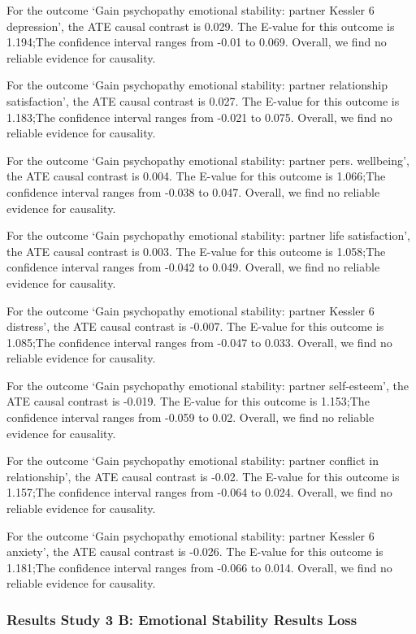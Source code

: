 \documentclass[
  singlecolumn]{article}
\begin{document}
For the outcome `Gain psychopathy emotional stability: partner Kessler 6
depression', the ATE causal contrast is 0.029. The E-value for this
outcome is 1.194;The confidence interval ranges from -0.01 to 0.069.
Overall, we find no reliable evidence for causality.

For the outcome `Gain psychopathy emotional stability: partner
relationship satisfaction', the ATE causal contrast is 0.027. The
E-value for this outcome is 1.183;The confidence interval ranges from
-0.021 to 0.075. Overall, we find no reliable evidence for causality.

For the outcome `Gain psychopathy emotional stability: partner pers.
wellbeing', the ATE causal contrast is 0.004. The E-value for this
outcome is 1.066;The confidence interval ranges from -0.038 to 0.047.
Overall, we find no reliable evidence for causality.

For the outcome `Gain psychopathy emotional stability: partner life
satisfaction', the ATE causal contrast is 0.003. The E-value for this
outcome is 1.058;The confidence interval ranges from -0.042 to 0.049.
Overall, we find no reliable evidence for causality.

For the outcome `Gain psychopathy emotional stability: partner Kessler 6
distress', the ATE causal contrast is -0.007. The E-value for this
outcome is 1.085;The confidence interval ranges from -0.047 to 0.033.
Overall, we find no reliable evidence for causality.

For the outcome `Gain psychopathy emotional stability: partner
self-esteem', the ATE causal contrast is -0.019. The E-value for this
outcome is 1.153;The confidence interval ranges from -0.059 to 0.02.
Overall, we find no reliable evidence for causality.

For the outcome `Gain psychopathy emotional stability: partner conflict
in relationship', the ATE causal contrast is -0.02. The E-value for this
outcome is 1.157;The confidence interval ranges from -0.064 to 0.024.
Overall, we find no reliable evidence for causality.

For the outcome `Gain psychopathy emotional stability: partner Kessler 6
anxiety', the ATE causal contrast is -0.026. The E-value for this
outcome is 1.181;The confidence interval ranges from -0.066 to 0.014.
Overall, we find no reliable evidence for causality.

\subsubsection{Results Study 3 B: Emotional Stability Results
Loss}\label{results-study-3-b-emotional-stability-results-loss}
\end{document}
